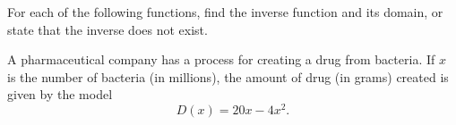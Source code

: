 \begin{questions}

\newpage
\question 
    For each of the following functions, find the inverse function and its domain, or state that the inverse does not exist.


\newpage
\question 
    A pharmaceutical company has a process for creating a drug from bacteria. If  $x$ is the number of bacteria (in millions), the amount of drug (in grams) created is given by the model 
    \[D(x)=20x-4x^2.\]
\end{questions}
